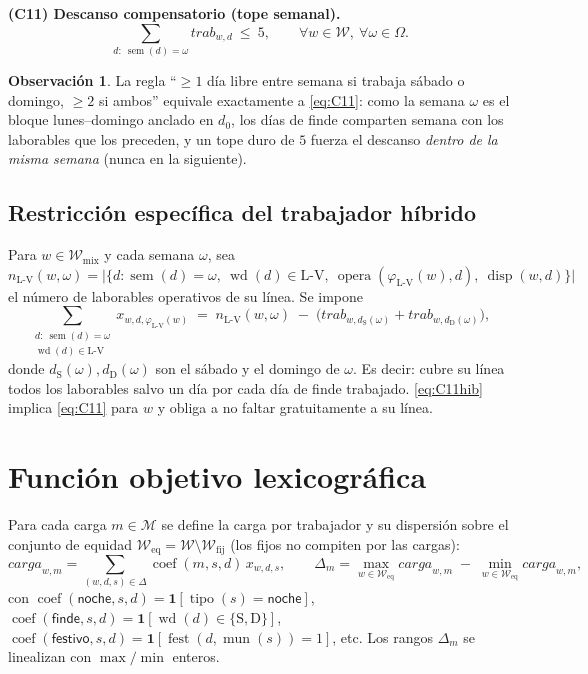 \documentclass[11pt,a4paper]{article}
\newcommand{\indic}[1]{\mathbf{1}\!\left[#1\right]}
\newcommand{\opera}{\operatorname{opera}}
\newcommand{\tipo}{\operatorname{tipo}}
\newcommand{\munf}{\operatorname{mun}}
\newcommand{\fest}{\operatorname{fest}}
\newcommand{\avail}{\operatorname{disp}}
\newcommand{\wkd}{\operatorname{wd}}
\newcommand{\sem}{\operatorname{sem}}
\newcommand{\coef}{\operatorname{coef}}
\newcommand{\work}{\mathit{trab}}
\newcommand{\load}{\mathit{carga}}
\newcommand{\Wk}{\mathcal{W}}
\newcommand{\Mk}{\mathcal{M}}
\newcommand{\Wfij}{\Wk_{\mathrm{fij}}}
\newcommand{\Wmix}{\Wk_{\mathrm{mix}}}
\newcommand{\Lv}{\mathrm{L\text{-}V}}
\theoremstyle{definition}
\newtheorem{obs}{Observación}
\begin{document}
\noindent\textbf{(C11) Descanso compensatorio (tope semanal).}
\begin{equation}\label{eq:C11}
  \sum_{d:\ \sem(d)=\omega}\work_{w,d}\ \le\ 5, \qquad \forall w\in\Wk,\ \forall \omega\in\Omega.
\end{equation}
\begin{obs}
La regla ``$\ge 1$ día libre entre semana si trabaja sábado o domingo, $\ge 2$ si ambos''
equivale exactamente a \eqref{eq:C11}: como la semana $\omega$ es el bloque lunes--domingo
anclado en $d_{0}$, los días de finde comparten semana con los laborables que los preceden,
y un tope duro de $5$ fuerza el descanso \emph{dentro de la misma semana} (nunca en la
siguiente).
\end{obs}

\subsection{Restricción específica del trabajador híbrido}
Para $w\in\Wmix$ y cada semana $\omega$, sea
$n_{\Lv}(w,\omega)=\big|\{d:\sem(d)=\omega,\ \wkd(d)\in\Lv,\ \opera(\varphi_{\Lv}(w),d),\ \avail(w,d)\}\big|$
el número de laborables operativos de su línea. Se impone
\begin{equation}\label{eq:C11hib}
  \sum_{\substack{d:\ \sem(d)=\omega\\ \wkd(d)\in\Lv}} x_{w,d,\varphi_{\Lv}(w)}
  \;=\; n_{\Lv}(w,\omega)\;-\;\big(\work_{w,d_{\mathrm S}(\omega)}+\work_{w,d_{\mathrm D}(\omega)}\big),
\end{equation}
donde $d_{\mathrm S}(\omega),d_{\mathrm D}(\omega)$ son el sábado y el domingo de $\omega$.
Es decir: cubre su línea todos los laborables salvo un día por cada día de finde trabajado.
\eqref{eq:C11hib} implica \eqref{eq:C11} para $w$ y obliga a no faltar gratuitamente a su línea.

\section{Función objetivo lexicográfica}

Para cada carga $m\in\Mk$ se define la carga por trabajador y su dispersión sobre el conjunto
de equidad $\Wk_{\mathrm{eq}}=\Wk\setminus\Wfij$ (los fijos no compiten por las cargas):
\begin{equation}
  \load_{w,m}=\sum_{(w,d,s)\in\Delta}\coef(m,s,d)\,x_{w,d,s},
  \qquad
  \Delta_{m}= \max_{w\in\Wk_{\mathrm{eq}}}\load_{w,m}\;-\;\min_{w\in\Wk_{\mathrm{eq}}}\load_{w,m},
\end{equation}
con $\coef(\textsf{noche},s,d)=\indic{\tipo(s)=\textsf{noche}}$,
$\coef(\textsf{finde},s,d)=\indic{\wkd(d)\in\{\mathrm S,\mathrm D\}}$,
$\coef(\textsf{festivo},s,d)=\indic{\fest(d,\munf(s))=1}$, etc. Los rangos $\Delta_{m}$ se
linealizan con $\max/\min$ enteros.
\end{document}
